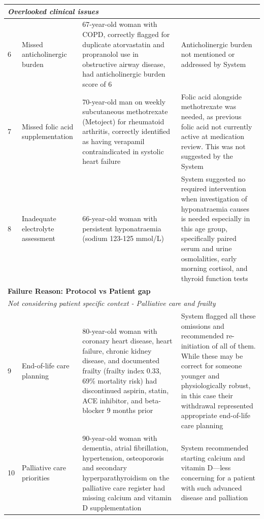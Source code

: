 {\begin{longtable}{p{}p{}p{}p{}}
                \midrule
                \multicolumn{4}{l}{\textit{Overlooked clinical issues}} \\
                \midrule
                \hypertarget{vignette-6}{6} & Missed anticholinergic burden & 67-year-old woman with COPD, correctly flagged for duplicate atorvastatin and propranolol use in obstructive airway disease, had anticholinergic burden score of 6 & Anticholinergic burden not mentioned or addressed by System \\
                \midrule
                \hypertarget{vignette-7}{7} & Missed folic acid supplementation & 70-year-old man on weekly subcutaneous methotrexate (Metoject) for rheumatoid arthritis, correctly identified as having verapamil contraindicated in systolic heart failure & Folic acid alongside methotrexate was needed, as previous folic acid not currently active at medication review. This was not suggested by the System \\
                \midrule
                \hypertarget{vignette-8}{8} & Inadequate electrolyte assessment & 66-year-old woman with persistent hyponatraemia (sodium 123-125 mmol/L) & System suggested no required intervention when investigation of hyponatraemia causes is needed especially in this age group, specifically paired serum and urine osmolalities, early morning cortisol, and thyroid function tests \\
                \midrule
                \multicolumn{4}{l}{\textbf{Failure Reason: Protocol vs Patient gap}} \\
                \midrule
                \multicolumn{4}{l}{\textit{Not considering patient specific context - Palliative care and frailty}} \\
                \midrule
                \hypertarget{vignette-9}{9} & End-of-life care planning & 80-year-old woman with coronary heart disease, heart failure, chronic kidney disease, and documented frailty (frailty index 0.33, 69\% mortality risk) had discontinued aspirin, statin, ACE inhibitor, and beta-blocker 9 months prior & System flagged all these omissions and recommended re-initiation of all of them. While these may be correct for someone younger and physiologically robust, in this case their withdrawal represented appropriate end-of-life care planning \\
                \midrule
                \hypertarget{vignette-10}{10} & Palliative care priorities & 90-year-old woman with dementia, atrial fibrillation, hypertension, osteoporosis and secondary hyperparathyroidism on the palliative care register had missing calcium and vitamin D supplementation & System recommended starting calcium and vitamin D—less concerning for a patient with such advanced disease and palliation \\

\end{longtable}}
